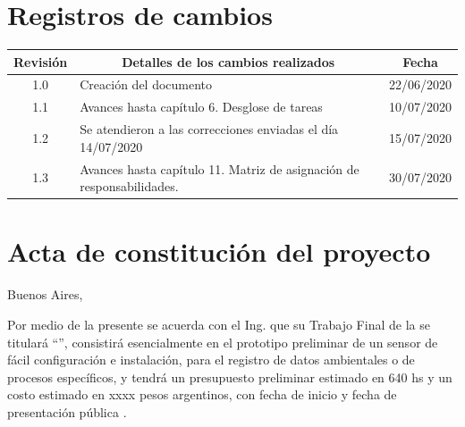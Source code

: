 \documentclass[11pt]{charter}
\begin{document}
\maketitle
\thispagestyle{empty}
\pagebreak


\thispagestyle{empty}
{\setlength{\parskip}{0pt}
\tableofcontents{}
}
\pagebreak


\section{Registros de cambios}
\label{sec:registro}


\begin{table}[ht]
\label{tab:registro}
\centering

\begin{tabularx}{\linewidth}{@{}|c|X|c|@{}}
\hline
\rowcolor[HTML]{C0C0C0} 
Revisión & \multicolumn{1}{c|}{\cellcolor[HTML]{C0C0C0}Detalles de los cambios realizados} & Fecha      \\ \hline
1.0      & Creación del documento                                                          & 22/06/2020 \\ \hline
1.1      & Avances hasta capítulo 6. Desglose de tareas									   & 10/07/2020 \\ \hline
1.2      & Se atendieron a las correcciones enviadas el día 14/07/2020                     & 15/07/2020 \\ \hline
1.3      & Avances hasta capítulo 11. Matriz de asignación de responsabilidades.           & 30/07/2020 \\ \hline
\end{tabularx}
\end{table}

\pagebreak



\section{Acta de constitución del proyecto}
\label{sec:acta}

\begin{flushright}
Buenos Aires, \fechaInicioName
\end{flushright}

\vspace{2cm}

Por medio de la presente se acuerda con el Ing. \authorname\hspace{1px} que su Trabajo Final de la \degreename\hspace{1px} se titulará ``\ttitle'', consistirá esencialmente en el prototipo preliminar de un sensor de fácil configuración e instalación, para el registro de datos ambientales o de procesos específicos, y tendrá un presupuesto preliminar estimado en 640 hs y un costo estimado en xxxx pesos argentinos, con fecha de inicio \fechaInicioName\hspace{1px} y fecha de presentación pública \fechaFinalName.
\end{document}
